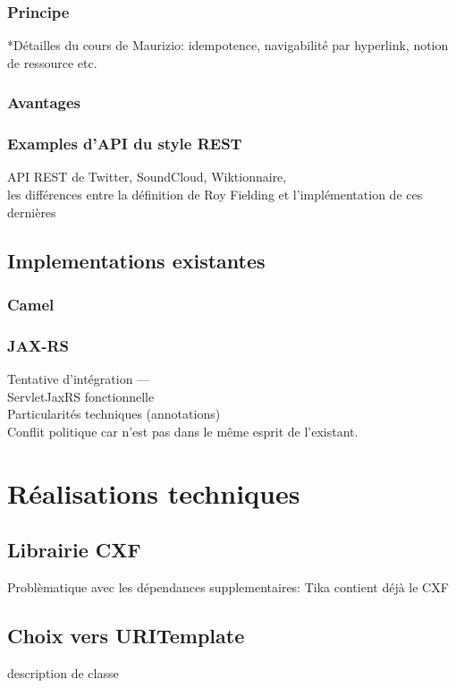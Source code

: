 \subsubsection{Principe}
*Détailles du cours de Maurizio: idempotence, navigabilité par hyperlink, 
notion de ressource etc.
\subsubsection{Avantages}
\subsubsection{Examples d'API du style REST}
API REST de Twitter, SoundCloud, Wiktionnaire,\\
les différences entre la définition de Roy Fielding et l'implémentation de ces dernières

\subsection{Implementations existantes}
\subsubsection{Camel}
\subsubsection{JAX-RS}
Tentative d'intégration ---\\
ServletJaxRS fonctionnelle\\
Particularités techniques (annotations) \\
Conflit politique car n'est pas dans le même esprit de l'existant.\\





\section{Réalisations techniques}

\subsection{Librairie CXF}
Problèmatique avec les dépendances supplementaires: 
Tika contient déjà le CXF
\subsection{Choix vers URITemplate}
description de classe
